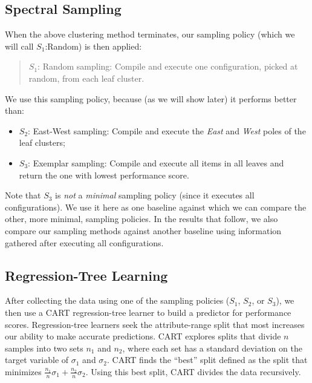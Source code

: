 \documentclass{sig-alternative}
\newcommand{\bi}{\begin{itemize}}%
\newcommand{\ei}{\end{itemize}}
\begin{document}
\subsection{Spectral Sampling}\label{sect:sample}
When the above clustering method terminates, our  sampling policy (which we will call $S_1$:Random) is then applied:
\begin{quote}
$S_1$: Random sampling: Compile and execute one  configuration,  picked at random, from each leaf cluster.
\end{quote}
We use this sampling policy, because (as we will show later) it performs better than:
\bi
\item $S_2$: East-West sampling: Compile and execute the {\em East} and {\em West} poles of the leaf clusters;
\item $S_3$: Exemplar sampling: Compile and execute all items in all leaves and return the one
with lowest performance score.
\ei
Note that $S_3$ is {\em not} a {\em minimal} sampling policy (since it executes all configurations). 
We use it here as one  baseline
against which we can compare the other, more minimal, sampling policies. In the results
that follow, we also compare our 
sampling methods against another baseline using information gathered after executing
all configurations.

\subsection{Regression-Tree Learning}
After collecting the data using one of the sampling policies ($S_1$, $S_2$, or $S_3$), we then use a CART regression-tree learner \cite{breiman1984} to build a predictor for performance scores. Regression-tree learners seek the attribute-range split that most increases
our ability to make accurate predictions.
CART explores splits that divide $n$ samples  into two sets  $n_1$ and $n_2$, where each set  has a  standard deviation on the target variable of $\sigma_1$ and  $\sigma_2$.
CART finds the ``best'' split defined as the split that minimizes $\frac{n_1}{n}\sigma_1 + \frac{n_2}{n}\sigma_2$.
Using this best split, CART divides the data recursively.
 
\end{document}
